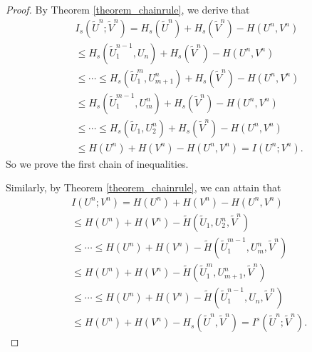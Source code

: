 \documentclass[12pt, draftclsnofoot,onecolumn]{IEEEtran}
\begin{document}
\begin{proof}
By Theorem \ref{theorem_chainrule}, we derive that
\begin{equation}
\begin{aligned}
&I_s(\tilde{U}^n;\tilde{V}^n)=H_s(\tilde{U}^n)+H_s(\tilde{V}^n)-H(U^n,V^n)\\
&\leq H_s(\tilde{U}_1^{n-1}, U_n)+H_s(\tilde{V}^n)-H(U^n,V^n)\\
&\leq \cdots \leq H_s(\tilde{U}_1^m, U_{m+1}^n)+H_s(\tilde{V}^n)-H(U^n,V^n)\\
&\leq H_s(\tilde{U}_1^{m-1}, U_{m}^n)+H_s(\tilde{V}^n)-H(U^n,V^n)\\
&\leq \cdots \leq H_s(\tilde{U}_1, U_2^n)+H_s(\tilde{V}^n)-H(U^n,V^n)\\
&\leq H(U^n)+H(V^n)-H(U^n,V^n) = I(U^n;V^n).
\end{aligned}
\end{equation}
So we prove the first chain of inequalities.

Similarly, by Theorem \ref{theorem_chainrule}, we can attain that
\begin{equation}
\begin{aligned}
&I(U^n;V^n)=H(U^n)+H(V^n)-H(U^n,V^n)\\
&\leq H(U^n)+H(V^n)-\tilde{H}(\tilde{U}_1,U_2^n,\tilde{V}^n)\\
&\leq \cdots \leq H(U^n)+H(V^n)-\tilde{H}(\tilde{U}_1^{m-1},U_{m}^n,\tilde{V}^n)\\
&\leq H(U^n)+H(V^n)-\tilde{H}(\tilde{U}_1^{m},U_{m+1}^n,\tilde{V}^n)\\
&\leq \cdots \leq H(U^n)+H(V^n)-\tilde{H}(\tilde{U}_1^{n-1},U_{n},\tilde{V}^n)\\
&\leq H(U^n)+H(V^n)-H_s(\tilde{U}^n,\tilde{V}^n)=I^s(\tilde{U}^n;\tilde{V}^n).
\end{aligned}
\end{equation}


\end{proof}
\end{document}
